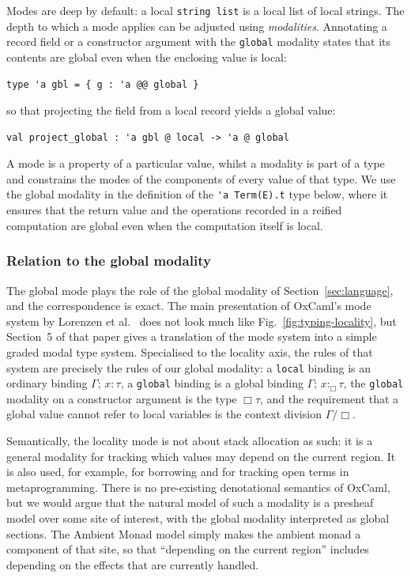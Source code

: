 \documentclass[acmsmall, screen, review, anonymous]{acmart}
\theoremstyle{definition}
\newcommand{\glob}{\mathop{\Box}}
\newcommand{\types}{\mathrel{:}}
\newcommand{\gtypes}{\mathrel{:_{\Box}}}
\newcommand{\ccons}[2]{#1;\,#2}
\newcommand{\lbind}[3]{\ccons{#1}{#2\types#3}}
\newcommand{\gbind}[3]{\ccons{#1}{#2\gtypes#3}}
\newcommand{\cdiv}[1]{#1/\Box}
\begin{document}
Modes are deep by default: a local \lstinline[style=oxcaml]{string list}
is a local list of local strings. The depth to which a mode applies can
be adjusted using \emph{modalities}. Annotating a record field or a
constructor argument with the \lstinline[style=oxcaml]{global} modality
states that its contents are global even when the enclosing value is
local:
\begin{lstlisting}[style=oxcaml]
  type 'a gbl = { g : 'a @@ global }
\end{lstlisting}
so that projecting the field from a local record yields a global value:
\begin{lstlisting}[style=oxcaml]
  val project_global : 'a gbl @ local -> 'a @ global
\end{lstlisting}
A mode is a property of a particular value, whilst a modality is part of
a type and constrains the modes of the components of every value of that
type. We use the global modality in the definition of the
\lstinline[style=oxcaml]{'a Term(E).t} type below, where it ensures that
the return value and the operations recorded in a reified computation
are global even when the computation itself is local.

\subsubsection{Relation to the global modality}
\label{sec:locality-modality}

The global mode plays the role of the global modality of
Section~\ref{sec:language}, and the correspondence is exact. The main
presentation of OxCaml's mode system by Lorenzen et
al.~\cite{lorenzen2024oxidizing} does not look much like
Fig.~\ref{fig:typing-locality}, but Section~5 of that paper gives a
translation of the mode system into a simple graded modal type
system. Specialised to the locality axis, the rules of that system are
precisely the rules of our global modality: a
\lstinline[style=oxcaml]{local} binding is an ordinary binding
$\lbind{\Gamma}{x}{\tau}$, a \lstinline[style=oxcaml]{global} binding is
a global binding $\gbind{\Gamma}{x}{\tau}$, the
\lstinline[style=oxcaml]{global} modality on a constructor argument is
the type $\glob \tau$, and the requirement that a global value cannot
refer to local variables is the context division $\cdiv{\Gamma}$.

Semantically, the locality mode is not about stack allocation as such:
it is a general modality for tracking which values may depend on the
current region. It is also used, for example, for borrowing and for
tracking open terms in metaprogramming. There is no pre-existing
denotational semantics of OxCaml, but we would argue that the natural
model of such a modality is a presheaf model over some site of interest,
with the global modality interpreted as global sections. The Ambient
Monad model simply makes the ambient monad a component of that site, so
that ``depending on the current region'' includes depending on the
effects that are currently handled.
\end{document}
